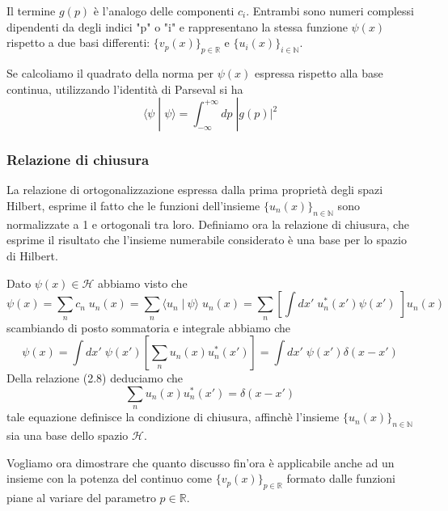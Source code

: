 \noindent Il termine $g(p)$ \`e l'analogo delle componenti $c_i$. Entrambi sono numeri complessi dipendenti da degli indici "p" o "i" e rappresentano la stessa funzione $\psi(x)$ rispetto a due basi differenti: $\{v_p(x)\}_{p \in \mathbb{R}}$ e $\{u_{i}(x) \}_{i \in \mathbb{N}}$.

\noindent Se calcoliamo il quadrato della norma per $\psi(x)$ espressa rispetto alla base continua, utilizzando l'identit\`a di Parseval si ha 
\begin{equation}
\langle \psi \;|\; \psi \rangle = \int_{-\infty}^{+\infty}dp \; |g(p)|^2	
\end{equation}  

\subsubsection{Relazione di chiusura}

La relazione di ortogonalizzazione espressa dalla prima propriet\`a degli spazi Hilbert, esprime il fatto che le funzioni dell'insieme $\{u_n(x)\}_{n \in \mathbb{N}}$ sono normalizzate a 1 e ortogonali tra loro. Definiamo ora la relazione di chiusura, che esprime il risultato che l'insieme numerabile considerato \`e una base per lo spazio di Hilbert.
\newline 

\noindent Dato $\psi(x) \in \mathcal{H}$ abbiamo visto che 
\begin{equation*}
	\psi(x) = \sum_{n} c_n \; u_n(x) = \sum_{n} \langle u_n \;|\:\psi \rangle \; u_n(x) = \sum_{n} \left [ \int dx' \; u_n^*(x')\psi(x') \; \right ]u_n(x)
\end{equation*}
scambiando di posto sommatoria e integrale abbiamo che 
\begin{equation}
	\psi(x) = \int dx' \; \psi(x') \left [\sum_{n} u_n(x)u_{n}^*(x') \right ] = \int dx' \; \psi(x')\delta(x-x')  
\end{equation}
Della relazione (2.8) deduciamo che 
\begin{equation}
	\sum_{n} u_n(x)u_{n}^*(x') = \delta(x-x')
\end{equation}
tale equazione definisce la condizione di chiusura, affinch\`e l'insieme $\{u_n(x)\}_{n \in \mathbb{N}}$ sia una base dello spazio $\mathcal{H}$.
\newline

\noindent Vogliamo ora dimostrare che quanto discusso fin'ora \`e applicabile anche ad un insieme con la potenza del continuo come $\{v_p(x)\}_{p \in \mathbb{R}}$ formato dalle funzioni piane al variare del parametro $p \in \mathbb{R}$.

